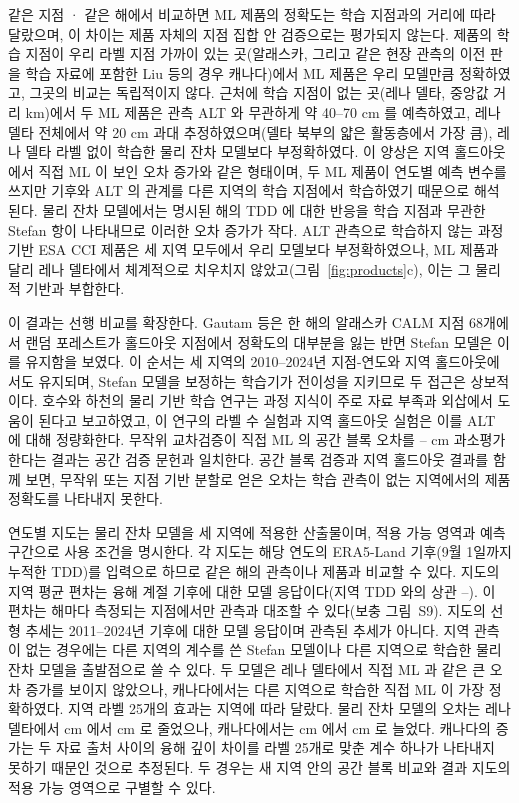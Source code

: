 같은 지점 · 같은 해에서 비교하면 ML 제품의 정확도는 학습 지점과의 거리에 따라 달랐으며, 이 차이는 제품 자체의 지점 집합 안 검증으로는 평가되지 않는다. 제품의 학습 지점이 우리 라벨 지점 가까이 있는 곳(알래스카, 그리고 같은 현장 관측의 이전 판을 학습 자료에 포함한 Liu 등의 경우 캐나다)에서 ML 제품은 우리 모델만큼 정확하였고, 그곳의 비교는 독립적이지 않다. 근처에 학습 지점이 없는 곳(레나 델타, 중앙값 거리 \ndistweiLemed{} km)에서 두 ML 제품은 관측 ALT 와 무관하게 약 40--70 cm 를 예측하였고, 레나 델타 전체에서 약 20 cm 과대 추정하였으며(델타 북부의 얇은 활동층에서 가장 큼), 레나 델타 라벨 없이 학습한 물리 잔차 모델보다 부정확하였다. 이 양상은 지역 홀드아웃에서 직접 ML 이 보인 오차 증가와 같은 형태이며, 두 ML 제품이 연도별 예측 변수를 쓰지만 기후와 ALT 의 관계를 다른 지역의 학습 지점에서 학습하였기 때문으로 해석된다. 물리 잔차 모델에서는 명시된 해의 TDD 에 대한 반응을 학습 지점과 무관한 Stefan 항이 나타내므로 이러한 오차 증가가 작다. ALT 관측으로 학습하지 않는 과정 기반 ESA CCI 제품은 세 지역 모두에서 우리 모델보다 부정확하였으나, ML 제품과 달리 레나 델타에서 체계적으로 치우치지 않았고(그림~\ref{fig:products}c), 이는 그 물리적 기반과 부합한다.

이 결과는 선행 비교를 확장한다. Gautam 등\cite{Gautam2025}은 한 해의 알래스카 CALM 지점 68개에서 랜덤 포레스트가 홀드아웃 지점에서 정확도의 대부분을 잃는 반면 Stefan 모델은 이를 유지함을 보였다. 이 순서는 세 지역의 2010--2024년 지점-연도와 지역 홀드아웃에서도 유지되며, Stefan 모델을 보정하는 학습기가 전이성을 지키므로 두 접근은 상보적이다. 호수와 하천의 물리 기반 학습 연구는 과정 지식이 주로 자료 부족과 외삽에서 도움이 된다고 보고하였고\cite{Read2019,Jia2021,Willard2022}, 이 연구의 라벨 수 실험과 지역 홀드아웃 실험은 이를 ALT 에 대해 정량화한다. 무작위 교차검증이 직접 ML 의 공간 블록 오차를 \noptimLeDz--\noptimCaDz{} cm 과소평가한다는 결과는 공간 검증 문헌\cite{Roberts2017,Ploton2020,MeyerPebesma2022}과 일치한다. 공간 블록 검증과 지역 홀드아웃 결과를 함께 보면, 무작위 또는 지점 기반 분할로 얻은 오차는 학습 관측이 없는 지역에서의 제품 정확도를 나타내지 못한다.

연도별 지도는 물리 잔차 모델을 세 지역에 적용한 산출물이며, 적용 가능 영역과 예측 구간으로 사용 조건을 명시한다. 각 지도는 해당 연도의 ERA5-Land 기후(9월 1일까지 누적한 TDD)를 입력으로 하므로 같은 해의 관측이나 제품과 비교할 수 있다. 지도의 지역 평균 편차는 융해 계절 기후에 대한 모델 응답이다(지역 TDD 와의 상관 \ntddanomAk{}--\ntddanomCa). 이 편차는 해마다 측정되는 지점에서만 관측과 대조할 수 있다(보충 그림~S9). 지도의 선형 추세는 2011--2024년 기후에 대한 모델 응답이며 관측된 추세가 아니다. 지역 관측이 없는 경우에는 다른 지역의 계수를 쓴 Stefan 모델이나 다른 지역으로 학습한 물리 잔차 모델을 출발점으로 쓸 수 있다. 두 모델은 레나 델타에서 직접 ML 과 같은 큰 오차 증가를 보이지 않았으나, 캐나다에서는 다른 지역으로 학습한 직접 ML 이 가장 정확하였다. 지역 라벨 25개의 효과는 지역에 따라 달랐다. 물리 잔차 모델의 오차는 레나 델타에서 \ntlrmseLeRszero{} cm 에서 \ntlrmseLeRstwfive{} cm 로 줄었으나, 캐나다에서는 \ntlrmseCaRszero{} cm 에서 \ntlrmseCaRstwfive{} cm 로 늘었다. 캐나다의 증가는 두 자료 출처 사이의 융해 깊이 차이를 라벨 25개로 맞춘 계수 하나가 나타내지 못하기 때문인 것으로 추정된다. 두 경우는 새 지역 안의 공간 블록 비교와 결과 지도의 적용 가능 영역으로 구별할 수 있다.

